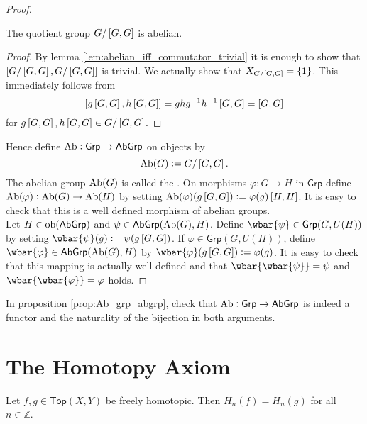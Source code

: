 \begin{proof}
	\begin{corollary}
		The quotient group $G/\sbr{G,G}$ is abelian.
	\end{corollary}

	\begin{proof}
		By lemma \ref{lem:abelian_iff_commutator_trivial} it is enough to show that $\sbr[0]{G/\sbr{G,G},G/\sbr{G,G}}$ is trivial. We actually show that $X_{G/\sbr[0]{G,G}} = \cbr{1}$. This immediately follows from
		\begin{equation*}
			\sbr[0]{g\sbr{G,G},h\sbr{G,G}} = ghg^{-1}h^{-1}\sbr{G,G} = \sbr{G,G}
		\end{equation*}
		\noindent for $g\sbr{G,G},h\sbr{G,G} \in G/\sbr{G,G}$.
	\end{proof}

	Hence define $\operatorname{Ab} : \mathsf{Grp} \to \mathsf{AbGrp}$ on objects by
	\begin{equation*}
		\Ab(G) := G/\sbr{G,G}.
	\end{equation*}
	The abelian group $\operatorname{Ab}(G)$ is called the . On morphisms $\varphi : G \to H$ in $\mathsf{Grp}$ define $\operatorname{Ab}(\varphi) : \operatorname{Ab}(G) \to \operatorname{Ab}(H)$ by setting $\Ab(\varphi)(g\sbr{G,G}) := \varphi(g)\sbr{H,H}$. It is easy to check that this is a well defined morphism of abelian groups.\\
	Let $H \in \operatorname{ob}(\mathsf{AbGrp})$ and $\psi \in \mathsf{AbGrp}(\operatorname{Ab}(G),H)$. Define $\wbar{\psi} \in \mathsf{Grp}(G,U(H))$ by setting $\wbar{\psi}(g) := \psi(g\sbr{G,G})$. If $\varphi \in \mathsf{Grp}(G,U(H))$, define $\wbar{\varphi} \in \mathsf{AbGrp}(\Ab(G),H)$ by $\wbar{\varphi}(g\sbr{G,G}) := \varphi(g)$. It is easy to check that this mapping is actually well defined and that $\wbar{\wbar{\psi}} = \psi$ and $\wbar{\wbar{\varphi}} = \varphi$ holds.
\end{proof}

\begin{exercise}
	In proposition \ref{prop:Ab_grp_abgrp}, check that $\operatorname{Ab} : \mathsf{Grp} \to \mathsf{AbGrp}$ is indeed a functor and the naturality of the bijection in both arguments. 
\end{exercise}


\section*{The Homotopy Axiom}

\begin{theorem}
	Let $f,g \in \mathsf{Top}(X,Y)$ be freely homotopic. Then $H_n(f) = H_n(g)$ for all $n \in \mathbb{Z}$.
\end{theorem}

